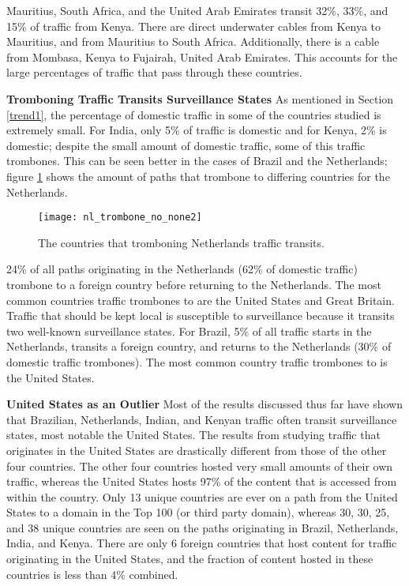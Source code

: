 Mauritius, South Africa, and the United Arab Emirates transit 32\%, 33\%, and 15\% of traffic from Kenya.  There are direct underwater cables from Kenya to Mauritius, and from Mauritius to South Africa.  Additionally, there is a cable from Mombasa, Kenya to Fujairah, United Arab Emirates.  This accounts for the large percentages of traffic that pass through these countries.

{\bf Tromboning Traffic Transits Surveillance States}
As mentioned in Section \ref{trend1}, the percentage of domestic traffic in some of the countries studied is extremely small.  For India, only 5\% of traffic is domestic and for Kenya, 2\% is domestic; despite the small amount of domestic traffic, some of this traffic trombones.  This can be seen better in the cases of Brazil and the Netherlands; figure \ref{fig:trombone_netherlands} shows the amount of paths that trombone to differing countries for the Netherlands.

\begin{figure}
\centering
\texttt{[image: nl\_trombone\_no\_none2]}
\caption{The countries that tromboning Netherlands traffic transits.}
\label{fig:trombone_netherlands}
\end{figure}

24\% of all paths originating in the Netherlands (62\% of domestic traffic) trombone to a foreign country before returning to the Netherlands. The most common countries traffic trombones to are the United States and Great Britain.  Traffic that should be kept local is susceptible to surveillance because it transits two well-known surveillance states.  For Brazil, 5\% of all traffic starts in the Netherlands, transits a foreign country, and returns to the Netherlands (30\% of domestic traffic trombones).  The most common country traffic trombones to is the United States. 

{\bf United States as an Outlier}
Most of the results discussed thus far have shown that Brazilian, Netherlands, Indian, and Kenyan traffic often transit surveillance states, most notable the United States.  The results from studying traffic that originates in the United States are drastically different from those of the other four countries.  The other four countries hosted very small amounts of their own traffic, whereas the United States hosts 97\% of the content that is accessed from within the country.  Only 13 unique countries are ever on a path from the United States to a domain in the Top 100 (or third party domain), whereas 30, 30, 25, and 38 unique countries are seen on the paths originating in Brazil, Netherlands, India, and Kenya.  There are only 6 foreign countries that host content for traffic originating in the United States, and the fraction of content hosted in these countries is less than 4\% combined.

